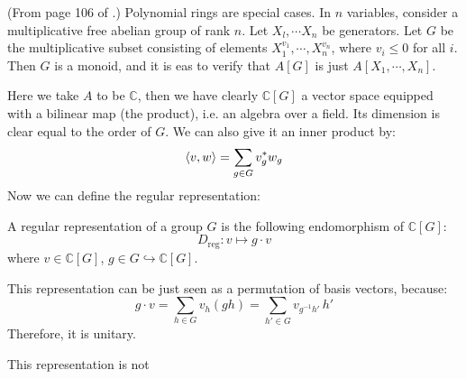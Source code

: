 \begin{ex}
    (From page 106 of \cite{lang-algebra}.)
    Polynomial rings are special cases. In $n$ variables, consider a
    multiplicative free abelian group of rank $n$. Let $X_l,\cdots
    X_n$ be generators. Let $G$ be the multiplicative subset
    consisting of elements $X_1^{v_1},\cdots,X_n^{v_n}$, where
    $v_i\leq 0$ for all $i$. Then $G$ is a monoid, and it is eas to
    verify that $A[G]$ is just $A[X_1,\cdots, X_n]$.
\end{ex}

Here we take $A$ to be $\mathbb{C}$, then we have clearly
$\mathbb{C}[G]$ a vector space equipped with a bilinear map (the
product), i.e. an algebra over a field. Its dimension is clear equal
to the order of $G$. We can also give it an inner product by:
\begin{equation}
    \braket{v,w} =\sum_{g\in G} v_g^* w_g
\end{equation}
Now we can define the regular representation:

\begin{defi}
    A regular representation of a group $G$ is the following
    endomorphism of $\mathbb{C}[G]$:
    \begin{equation}
        D_\text{reg}: v \mapsto g\cdot v
    \end{equation}
    where $v\in \mathbb{C}[G]$, $g\in G \hookrightarrow \mathbb{C}[G]$.
\end{defi}

\begin{remark}
    This representation can be just seen as a permutation of basis
    vectors, because:
    \begin{equation}
        g\cdot v = \sum_{h\in G} v_h (gh) = \sum_{h'\in G}
        v_{g^{-1}h'}\, h'
    \end{equation}
    Therefore, it is unitary.
\end{remark}

\begin{remark}
    This representation is not 
\end{remark}
